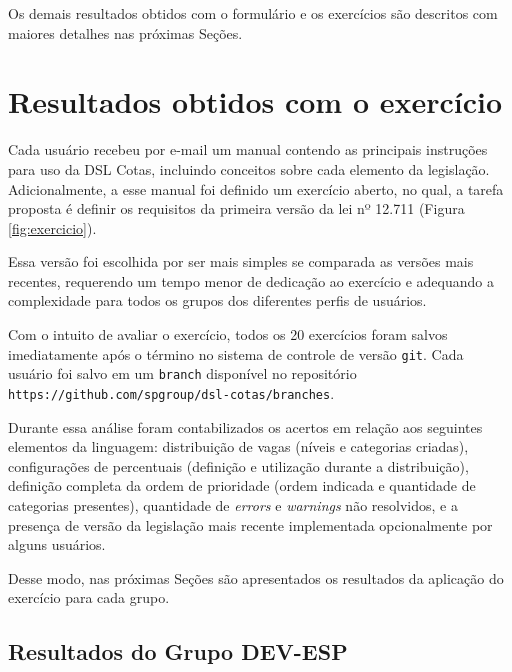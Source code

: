 Os demais resultados obtidos com o formulário e os exercícios são descritos com maiores detalhes nas próximas Seções.


\begin{landscape}

\end{landscape}

\section{Resultados obtidos com o exercício}
\label{sec:analiseexercicio}

Cada usuário recebeu por e-mail um manual  contendo as principais instruções para uso da DSL Cotas, incluindo conceitos sobre cada elemento da legislação. Adicionalmente, a esse manual foi definido um exercício aberto, no qual, a tarefa proposta é definir os requisitos da primeira versão da lei nº 12.711 (Figura \ref{fig:exercicio}). 



Essa versão foi escolhida por ser mais simples se comparada as versões mais recentes, requerendo um tempo menor de dedicação ao exercício e adequando a complexidade para todos os grupos dos diferentes perfis de usuários. 


Com o intuito de avaliar o exercício, todos os 20 exercícios foram salvos imediatamente após o término no sistema de controle de versão \texttt{git}. Cada usuário foi salvo em um \texttt{branch} disponível no repositório \texttt{https://github.com/spgroup/dsl-cotas/branches}.


Durante essa análise foram contabilizados os acertos em relação aos seguintes elementos da linguagem: distribuição de vagas (níveis e categorias criadas), configurações de percentuais (definição e utilização durante a distribuição), definição completa da ordem de prioridade (ordem indicada e quantidade de categorias presentes), quantidade de \textit{errors} e \textit{warnings} não resolvidos, e a presença de versão da legislação mais recente implementada opcionalmente por alguns usuários.

Desse modo, nas próximas Seções são apresentados os resultados da aplicação do exercício para cada grupo.

\newpage
\subsection{Resultados do Grupo DEV-ESP}
\label{subsec:devesp}

